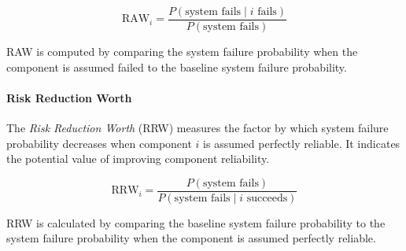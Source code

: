 \[
\text{RAW}_i = \frac{P(\text{system fails} \mid i \text{ fails})}{P(\text{system fails})}
\]

RAW is computed by comparing the system failure probability when the component is assumed failed to the baseline system failure probability.

\paragraph{Risk Reduction Worth}
The \emph{Risk Reduction Worth} (RRW) measures the factor by which system failure probability decreases when component $i$ is assumed perfectly reliable. It indicates the potential value of improving component reliability.

\[
\text{RRW}_i = \frac{P(\text{system fails})}{P(\text{system fails} \mid i \text{ succeeds})}
\]

RRW is calculated by comparing the baseline system failure probability to the system failure probability when the component is assumed perfectly reliable.




